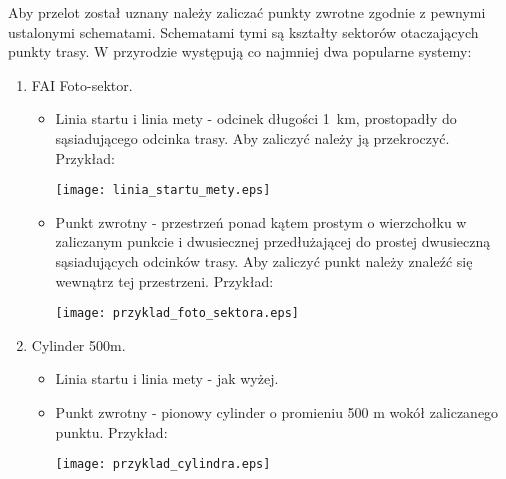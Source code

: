 \documentclass{article}
\begin{document}
Aby przelot został uznany należy zaliczać punkty zwrotne zgodnie z pewnymi
ustalonymi schematami. Schematami tymi są kształty sektorów otaczających
punkty trasy. W przyrodzie występują co najmniej dwa popularne systemy:
\begin{enumerate}
\item FAI Foto-sektor.
    \begin{itemize}
    \item Linia startu i linia mety - odcinek długości 1~km, prostopadły
        do sąsiadującego odcinka trasy. Aby zaliczyć należy ją przekroczyć.
        Przykład:
            \begin{center}
            \texttt{[image: linia\_startu\_mety.eps]}
            \end{center}
    \item Punkt zwrotny - przestrzeń ponad kątem prostym o wierzchołku w
        zaliczanym punkcie i dwusiecznej przedłużającej do prostej dwusieczną
        sąsiadujących odcinków trasy. Aby zaliczyć punkt należy znaleźć się
        wewnątrz tej przestrzeni. Przykład:
            \begin{center}
            \texttt{[image: przyklad\_foto\_sektora.eps]}
            \end{center}
    \end{itemize}
\item Cylinder 500m.
    \begin{itemize}
    \item Linia startu i linia mety - jak wyżej.
    \item Punkt zwrotny - pionowy cylinder o promieniu 500 m wokół
        zaliczanego punktu. Przykład:
            \begin{center}
            \texttt{[image: przyklad\_cylindra.eps]}
            \end{center}
    \end{itemize}
\end{enumerate}

\newpage
\end{document}
